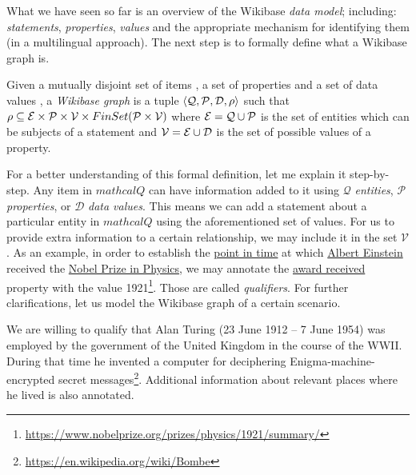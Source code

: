 What we have seen so far is an overview of the Wikibase \textit{data model}; including: \textit{statements}, \textit{properties}, \textit{values} and the appropriate mechanism for identifying them (in a multilingual approach). The next step is to formally define what a Wikibase graph is.

\begin{definition}
    Given a mutually disjoint set of items \ItemSet{}, a set of properties \PropSet{} and a set of data values \DataValueSet{}, a \emph{Wikibase graph} is a tuple $\langle\mathcal{Q},\mathcal{P},\mathcal{D},\rho\rangle$ such that $\rho\subseteq\mathcal{E}\times\mathcal{P}\times\mathcal{V}\times FinSet(\mathcal{P}\times\mathcal{V})$ where $\mathcal{E}=\mathcal{Q}\cup\mathcal{P}$ is the set of entities which can be subjects of a statement and $\mathcal{V}=\mathcal{E}\cup\mathcal{D}$ is the set of possible values of a property.
\end{definition}

For a better understanding of this formal definition, let me explain it step-by-step. Any item in $mathcal{Q}$ can have information added to it using $\mathcal{Q}$ \textit{entities}, $\mathcal{P}$ \textit{properties}, or $\mathcal{D}$ \textit{data values}. This means we can add a statement about a particular entity in $mathcal{Q}$ using the aforementioned set of values. For us to provide extra information to a certain relationship, we may include it in the set $\mathcal{V}$. As an example, in order to establish the \href{https://www.wikidata.org/wiki/Property:P585}{point in time} at which \href{https://www.wikidata.org/wiki/Q937} {Albert Einstein} received the \href{https://www.wikidata.org/wiki/Q38104}{Nobel Prize in Physics}, we may annotate the \href{https://www.wikidata.org/wiki/Property:P166}{award received} property with the value 1921\footnote{\url{https://www.nobelprize.org/prizes/physics/1921/summary/}}. Those are called \textit{qualifiers}. For further clarifications, let us model the Wikibase graph of a certain scenario.

\begin{example}
    \label{example:knowledgeGraph}
    We are willing to qualify that Alan Turing (23 June 1912 -- 7 June 1954) was employed by the government of the United Kingdom in the course of the WWII. During that time he invented a computer for deciphering Enigma-machine-encrypted secret messages\footnote{\url{https://en.wikipedia.org/wiki/Bombe}}. Additional information about relevant places where he lived is also annotated.
\end{example}

